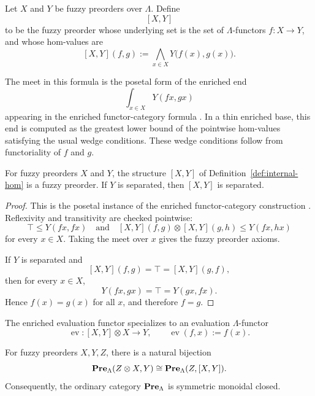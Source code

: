 \begin{definition}
\label{def:internal-hom}
    Let \(X\) and \(Y\) be fuzzy preorders over \(\Lambda\). Define
    \[
        [X,Y]
    \]
    to be the fuzzy preorder whose underlying set is the set of \(\Lambda\)-functors \(f:X\to Y\), and whose hom-values are
    \[
        [X,Y](f,g)
        :=
        \bigwedge_{x\in X}Y\bigl(f(x),g(x)\bigr).
    \]
\end{definition}

The meet in this formula is the posetal form of the enriched end
\[
    \int_{x\in X}Y(fx,gx)
\]
appearing in the enriched functor-category formula \cite[Section~2.2, formula~(2.10)]{Kelly1982BasicConcepts}. In a thin enriched base, this end is computed as the greatest lower bound of the pointwise hom-values satisfying the usual wedge conditions. These wedge conditions follow from functoriality of \(f\) and \(g\).

\begin{proposition}
\label{prop:internal-hom-is-fuzzy-preorder}
    For fuzzy preorders \(X\) and \(Y\), the structure \([X,Y]\) of Definition~\ref{def:internal-hom} is a fuzzy preorder. If \(Y\) is separated, then \([X,Y]\) is separated.
\end{proposition}

\begin{proof}
    This is the posetal instance of the enriched functor-category construction \cite[Section~2.2, formulas~(2.10), (2.14), and~(2.15)]{Kelly1982BasicConcepts}. Reflexivity and transitivity are checked pointwise:
    \[
        \top\leq Y(fx,fx)
        \quad\text{and}\quad
        [X,Y](f,g)\otimes[X,Y](g,h)\leq Y(fx,hx)
    \]
    for every \(x\in X\). Taking the meet over \(x\) gives the fuzzy preorder axioms.

    If \(Y\) is separated and
    \[
        [X,Y](f,g)=\top=[X,Y](g,f),
    \]
    then for every \(x\in X\),
    \[
        Y(fx,gx)=\top=Y(gx,fx).
    \]
    Hence \(f(x)=g(x)\) for all \(x\), and therefore \(f=g\).
\end{proof}

The enriched evaluation functor specializes to an evaluation \(\Lambda\)-functor \cite[Section~2.2, formula~(2.17)]{Kelly1982BasicConcepts}
\[
    \operatorname{ev}:[X,Y]\otimes X\to Y,
    \qquad
    \operatorname{ev}(f,x):=f(x).
\]

\begin{proposition}
\label{prop:tensor-hom-adjunction}
    For fuzzy preorders \(X,Y,Z\), there is a natural bijection
    \[
        \mathbf{Pre}_\Lambda(Z\otimes X,Y)
        \cong
        \mathbf{Pre}_\Lambda(Z,[X,Y]).
    \]
    Consequently, the ordinary category \(\mathbf{Pre}_\Lambda\) is symmetric monoidal closed.
\end{proposition}

